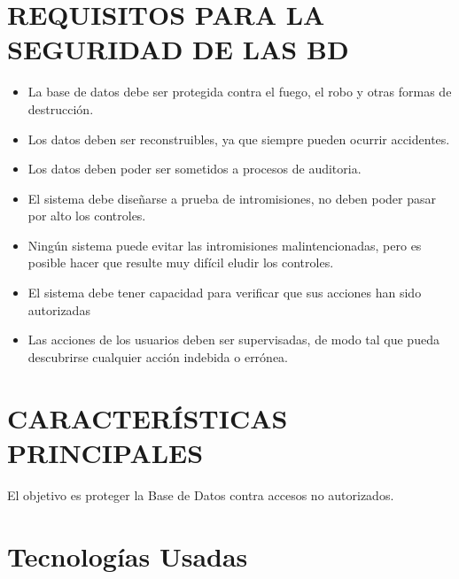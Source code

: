 \documentclass[conference]{IEEEtran}
\begin{document}
\section{REQUISITOS PARA LA SEGURIDAD DE LAS BD}
\begin{itemize}
\item \textbf{} La base de datos debe ser protegida contra el fuego, el robo y otras formas de destrucción.
\\
\item \textbf{} Los datos deben ser reconstruibles, ya que siempre pueden ocurrir accidentes.
\\
\item \textbf{} Los datos deben poder ser sometidos a procesos de auditoria.
\\
\item \textbf{} El sistema debe diseñarse a prueba de intromisiones, no deben poder pasar por alto los controles.
\\
\item \textbf{} Ningún sistema puede evitar las intromisiones malintencionadas, pero es posible hacer que resulte muy difícil eludir los controles.
\\
\item \textbf{} El sistema debe tener capacidad para verificar que sus acciones han sido autorizadas
\\
\item \textbf{} Las acciones de los usuarios deben ser supervisadas, de modo tal que pueda descubrirse cualquier acción indebida o errónea.
\\
\end{itemize}

\section{CARACTERÍSTICAS PRINCIPALES}
El objetivo es proteger la Base de Datos contra
accesos no autorizados.


\section{Tecnolog\'ias Usadas}
\end{document}
